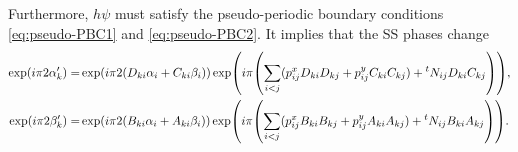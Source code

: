 \documentclass[11pt]{article}
\begin{document}

Furthermore, $h\psi$ must satisfy the pseudo-periodic boundary conditions \eqref{eq:pseudo-PBC1} and \eqref{eq:pseudo-PBC2}. It implies that the SS phases change
\begin{align}
    \exp(i\pi 2\alpha_k^\prime )=& \exp( i\pi 2 \qty(D_{ki}\alpha_i + C_{ki}\beta_i ) ) \exp( i\pi \qty( \sum_{i<j}(p^x_{ij} D_{ki}D_{kj} + p^y_{ij} C_{ki}C_{kj}) +{}^t N_{ij} D_{ki} C_{kj}  )), \label{eq:action on SS1} 
    \\
    \exp(i\pi 2\beta_k^\prime )=& \exp( i\pi 2 \qty(B_{ki}\alpha_i + A_{ki}\beta_i ) ) \exp( i\pi \qty( \sum_{i<j}(p^x_{ij} B_{ki}B_{kj} + p^y_{ij} A_{ki}A_{kj}) +{}^t N_{ij} B_{ki} A_{kj}  )) .  \label{eq:action on SS2} 
\end{align}
\end{document}
